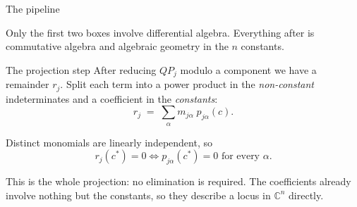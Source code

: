 \documentclass[10pt,aspectratio=169]{beamer}
\newcommand{\C}{\mathbb{C}}
\newcommand{\cstar}{c^{*}}
\begin{document}
\begin{frame}{The pipeline}
\begin{center}
\end{center}

\pause
\medskip
Only the first two boxes involve differential algebra. Everything after is
commutative algebra and algebraic geometry in the $n$ constants.
\end{frame}

\begin{frame}{The projection step}
After reducing $Q P_{j}$ modulo a component we have a remainder $r_{j}$. Split
each term into a power product in the \emph{non-constant} indeterminates and a
coefficient in the \emph{constants}:
\[
  r_{j} \;=\; \sum_{\alpha} m_{j\alpha}\; p_{j\alpha}(c) .
\]

\pause
\medskip
Distinct monomials are linearly independent, so
\[
  r_{j}(\cstar) = 0
  \iff
  p_{j\alpha}(\cstar) = 0 \text{ for every } \alpha .
\]

\pause
\medskip
\begin{alertblock}{}
This is the whole projection: \alert{no elimination is required}. The
coefficients already involve nothing but the constants, so they describe a locus
in $\C^{n}$ directly.
\end{alertblock}
\end{frame}
\end{document}
